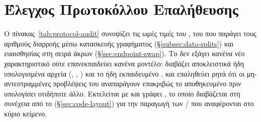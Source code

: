 \section{Έλεγχος Πρωτοκόλλου Επαλήθευσης}
\label{sec:protocol-audit-appendix}

Ο πίνακας~\ref{tab:protocol-audit} συνοψίζει τις ωμές τιμές του
\texttt{}, του  που παράγει τους
αριθμούς διαρροής μέσω κατασκευής γραφήματος (\S\ref{subsec:data-splits}) και
ευαισθησίας στη σειρά άκρων (\S\ref{sec:endpoint-swap}). Το  δεν
εξάγει κανένα νέο χαρακτηριστικό ούτε επανεκπαιδεύει κανένα μοντέλο: διαβάζει
αποκλειστικά ήδη υπολογισμένα αρχεία (\texttt{},
\texttt{}, \texttt{}) και το ήδη εκπαιδευμένο
\texttt{}, και επαληθεύει ρητά ότι οι
μη-αντεστραμμένες προβλέψεις του αναπαράγουν επακριβώς το αποθηκευμένο
\texttt{} πριν υπολογίσει οτιδήποτε άλλο.
Εκτελείται με
\texttt{} και γράφει
\texttt{}, το οποίο διαβάζεται στη
συνέχεια από το \texttt{} (\S\ref{sec:code-layout}) για την
παραγωγή των  \texttt{}/\texttt{} που αναφέρονται στο κύριο κείμενο.


